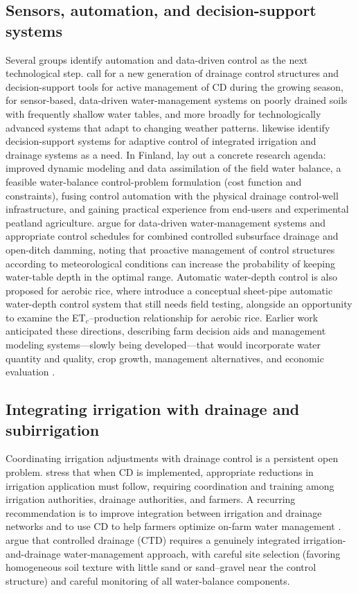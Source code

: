 \documentclass[11pt]{article}
\begin{document}
\subsection{Sensors, automation, and decision-support systems}
Several groups identify automation and data-driven control as the next technological step. \textcite{Youssef2023} call for a new generation of drainage control structures and decision-support tools for active management of CD during the growing season, for sensor-based, data-driven water-management systems on poorly drained soils with frequently shallow water tables, and more broadly for technologically advanced systems that adapt to changing weather patterns. \textcite{Ayars2015} likewise identify decision-support systems for adaptive control of integrated irrigation and drainage systems as a need. In Finland, \textcite{Ikonen2023} lay out a concrete research agenda: improved dynamic modeling and data assimilation of the field water balance, a feasible water-balance control-problem formulation (cost function and constraints), fusing control automation with the physical drainage control-well infrastructure, and gaining practical experience from end-users and experimental peatland agriculture. \textcite{Isomäki2024} argue for data-driven water-management systems and appropriate control schedules for combined controlled subsurface drainage and open-ditch damming, noting that proactive management of control structures according to meteorological conditions can increase the probability of keeping water-table depth in the optimal range. Automatic water-depth control is also proposed for aerobic rice, where \textcite{Arif2021} introduce a conceptual sheet-pipe automatic water-depth control system that still needs field testing, alongside an opportunity to examine the ET$_c$--production relationship for aerobic rice. Earlier work anticipated these directions, describing farm decision aids and management modeling systems---slowly being developed---that would incorporate water quantity and quality, crop growth, management alternatives, and economic evaluation \parencite{THOMAS1995}.

\subsection{Integrating irrigation with drainage and subirrigation}
Coordinating irrigation adjustments with drainage control is a persistent open problem. \textcite{Wahba2005} stress that when CD is implemented, appropriate reductions in irrigation application must follow, requiring coordination and training among irrigation authorities, drainage authorities, and farmers. A recurring recommendation is to improve integration between irrigation and drainage networks and to use CD to help farmers optimize on-farm water management \parencite{Ritzema2011,Ritzema2016}. \textcite{Dukhovny2018} argue that controlled drainage (CTD) requires a genuinely integrated irrigation-and-drainage water-management approach, with careful site selection (favoring homogeneous soil texture with little sand or sand--gravel near the control structure) and careful monitoring of all water-balance components.
\end{document}
